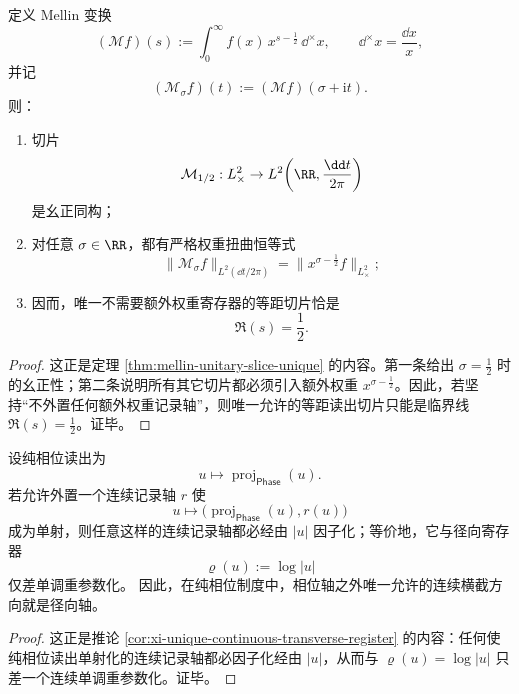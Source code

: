 \begin{theorem}[临界线的等距唯一性]\label{thm:conclusion-critical-line-unique-unweighted-isometric-slice}
定义 Mellin 变换
\[
(\mathcal M f)(s):=\int_0^\infty f(x)\,x^{s-\frac12}\,\dd^\times x,
\qquad
\dd^\times x=\frac{\dd x}{x},
\]
并记
\[
(\mathcal M_\sigma f)(t):=(\mathcal M f)(\sigma+\mathrm{i}t).
\]
则：
\begin{enumerate}
  \item 切片
  \[
  \mathcal M_{1/2}:L^2_\times\to L^2\!\left(\RR,\frac{\dd t}{2\pi}\right)
  \]
  是幺正同构；
  \item 对任意 \(\sigma\in\RR\)，都有严格权重扭曲恒等式
  \[
  \|\mathcal M_\sigma f\|_{L^2(\dd t/2\pi)}
  =
  \|x^{\sigma-\frac12}f\|_{L^2_\times};
  \]
  \item 因而，唯一不需要额外权重寄存器的等距切片恰是
  \[
  \Re(s)=\frac12.
  \]
\end{enumerate}
\end{theorem}
\begin{proof}
这正是定理 \ref{thm:mellin-unitary-slice-unique} 的内容。第一条给出 \(\sigma=\frac12\) 时的幺正性；第二条说明所有其它切片都必须引入额外权重 \(x^{\sigma-\frac12}\)。因此，若坚持“不外置任何额外权重记录轴”，则唯一允许的等距读出切片只能是临界线 \(\Re(s)=\frac12\)。证毕。
\end{proof}

\begin{theorem}[连续横截方向的唯一性]\label{thm:conclusion-radial-axis-unique-continuous-transverse-direction}
设纯相位读出为
\[
u\longmapsto \operatorname{proj}_{\mathsf{Phase}}(u).
\]
若允许外置一个连续记录轴 \(r\) 使
\[
u\longmapsto \bigl(\operatorname{proj}_{\mathsf{Phase}}(u),r(u)\bigr)
\]
成为单射，则任意这样的连续记录轴都必经由 \(|u|\) 因子化；等价地，它与径向寄存器
\[
\varrho(u):=\log|u|
\]
仅差单调重参数化。
因此，在纯相位制度中，相位轴之外唯一允许的连续横截方向就是径向轴。
\end{theorem}
\begin{proof}
这正是推论 \ref{cor:xi-unique-continuous-transverse-register} 的内容：任何使纯相位读出单射化的连续记录轴都必因子化经由 \(|u|\)，从而与 \(\varrho(u)=\log|u|\) 只差一个连续单调重参数化。证毕。
\end{proof}

